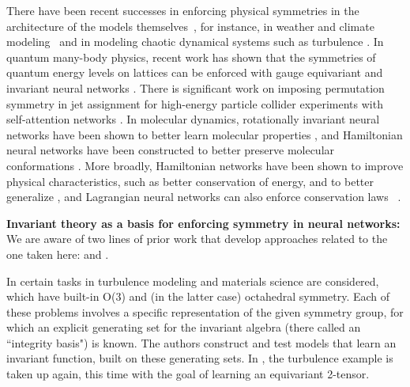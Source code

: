 \documentclass{article}
\renewcommand{\paragraph}[1]{\par\textbf{#1}}
\theoremstyle{Hogg}
\begin{document}
There have been recent successes in enforcing physical symmetries in the architecture of the models themselves~\cite{yu-physics}, for instance, in 
weather and climate
modeling~\cite{kashinath2021physics} and in modeling chaotic dynamical systems such as turbulence \cite{wang2020towards, wang2021incorporating}.
In quantum many-body physics, recent work has shown that the symmetries of quantum energy levels on lattices can be enforced with gauge equivariant and invariant neural networks \cite{choo2018quantum, boyda2020hsi, vieijra2020uantum, luo2020quantum, roth2021quantum, luo2021quantum}.
There is significant work on imposing permutation symmetry in jet assignment for high-energy particle collider experiments with self-attention networks \cite{fenton2020jet, lee2020jet}.
In molecular dynamics, rotationally invariant neural networks have been shown to better learn molecular properties \cite{anderson2019cormorant, wang2021molecular, schutt2021equivariant}, and Hamiltonian neural networks have been constructed to better preserve molecular conformations \cite{li2021hamnet}.
More broadly, Hamiltonian networks have been shown to improve physical characteristics, such as better conservation of energy, and to better generalize \cite{greydanus2019hamiltonian, sanchez-gonzalez2019hamiltonian, zhong2020symplectic}, and Lagrangian neural networks can also enforce conservation laws~ \cite{lutter2019lagrangian, cranmer2020lagrangian}.

\paragraph{Invariant theory as a basis for enforcing symmetry in neural networks:} 
We are aware of two lines of prior work that develop approaches related to the one taken here: \cite{ling2016machine, ling2016reynolds} and \cite{gripaios2021lorentz, haddadin2021invariant}.

In \cite{ling2016machine} certain tasks in turbulence modeling and materials science are considered, which have built-in O($3$) and (in the latter case) octahedral symmetry. Each of these problems involves a specific representation of the given symmetry group, for which an explicit generating set for the invariant algebra (there called an ``integrity basis") is known. The authors construct and test models that learn an invariant function, built on these generating sets. In \cite{ling2016reynolds}, the turbulence example is taken up again, this time with the goal of learning an equivariant 2-tensor.
\end{document}
